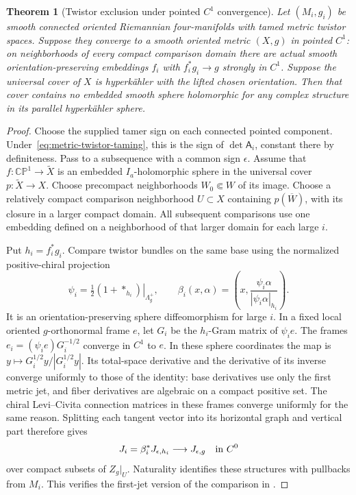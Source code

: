 \documentclass[11pt]{article}
\numberwithin{equation}{section}
\newtheorem{theorem}{Theorem}[section]
\theoremstyle{definition}
\theoremstyle{remark}
\newcommand{\CP}{\mathbb{CP}}
\begin{document}
\begin{theorem}[Twistor exclusion under pointed $C^1$ convergence]
\label{thm:c1-twistor-exclusion}
Let $(M_i,g_i)$ be smooth connected oriented Riemannian
four-manifolds with tamed metric twistor spaces. Suppose
they converge to a smooth oriented metric $(X,g)$ in pointed
$C^1$: on neighborhoods of every compact comparison domain
there are actual smooth orientation-preserving embeddings
$f_i$ with $f_i^*g_i\to g$ strongly in $C^1$.
Suppose the universal cover of $X$ is hyperk\"ahler with
the lifted chosen orientation. Then that cover contains
no embedded smooth sphere holomorphic for any complex
structure in its parallel hyperk\"ahler sphere.
\end{theorem}
\begin{proof}
Choose the supplied tamer sign on each connected pointed
component. Under~\eqref{eq:metric-twistor-taming}, this is
the sign of $\det\mathsf A_i$, constant there by definiteness.
Pass to a subsequence with a common sign $\epsilon$.
Assume that $f:\CP^1\to\widetilde X$ is an embedded
$I_a$-holomorphic sphere in the universal cover
$p:\widetilde X\to X$.
Choose precompact neighborhoods $W_0\Subset W$ of its image.
Choose a relatively compact comparison neighborhood $U\subset X$
containing $p(\overline W)$, with its closure in a larger
compact domain. All subsequent comparisons use one embedding
defined on a neighborhood of that larger domain for each large $i$.

Put $h_i=f_i^*g_i$. Compare twistor bundles on the same base
using the normalized positive-chiral projection
\[
 \psi_i=\left.\tfrac12(1+*_{h_i})\right|_{\Lambda_g^+},\qquad
 \beta_i(x,\alpha)=
       \left(x,\frac{\psi_i\alpha}{|\psi_i\alpha|_{h_i}}\right).
\]
It is an orientation-preserving sphere diffeomorphism for
large $i$. In a fixed local oriented $g$-orthonormal frame $e$,
let $G_i$ be the $h_i$-Gram matrix of $\psi_i e$. The frames
$e_i=(\psi_i e)G_i^{-1/2}$ converge in $C^1$ to $e$.
In these sphere coordinates the map is
$y\mapsto G_i^{1/2}y/|G_i^{1/2}y|$.
Its total-space derivative and the derivative of its inverse
converge uniformly to those of the identity: base derivatives
use only the first metric jet, and fiber derivatives are
algebraic on a compact positive set. The chiral Levi--Civita
connection matrices in these frames converge uniformly for
the same reason. Splitting each tangent vector into its
horizontal graph and vertical part therefore gives
\[
 J_i=\beta_i^*J_{\epsilon,h_i}\longrightarrow J_{\epsilon,g}
       \quad\hbox{in }C^0
\]
over compact subsets of $Z_g|_U$. Naturality identifies these
structures with pullbacks from $M_i$. This verifies the
first-jet version of the comparison in
\cite[Lemma~6]{Fine2017TwistorLimits}.


\end{proof}
\end{document}
